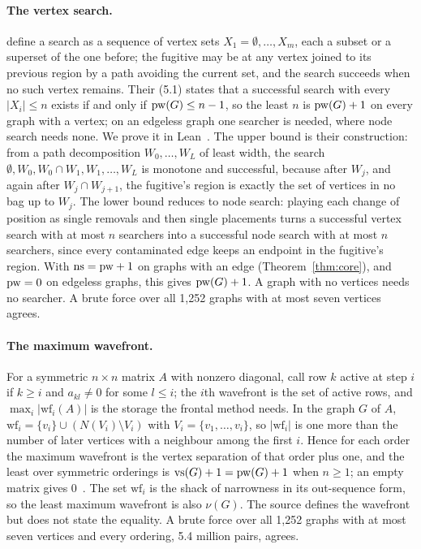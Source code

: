 \paragraph{The vertex search.} \citet[\S5]{BRST1991} define a search as a
sequence of vertex sets $X_1=\emptyset,\dots,X_m$, each a subset or a superset
of the one before; the fugitive may be at any vertex joined to its previous
region by a path avoiding the current set, and the search succeeds when no such
vertex remains. Their (5.1) states that a successful search with every
$|X_i|\le n$ exists if and only if $\mathrm{pw}(G)\le n-1$, so the least $n$ is
$\mathrm{pw}(G)+1$ on every graph with a vertex; on an edgeless graph one searcher is
needed, where node search needs none. We prove it in Lean~.
The upper bound is their construction: from a path decomposition
$W_0,\dots,W_L$ of least width, the search
$\emptyset,W_0,W_0\cap W_1,W_1,\dots,W_L$ is monotone and successful, because
after $W_j$, and again after $W_j\cap W_{j+1}$, the fugitive's region is
exactly the set of vertices in no bag up to $W_j$. The lower bound reduces to
node search: playing each change of position as single removals and then
single placements turns a successful vertex search with at most $n$ searchers
into a successful node search with at most $n$ searchers, since every
contaminated edge keeps an endpoint in the fugitive's region. With
$\mathrm{ns}=\mathrm{pw}+1$ on graphs with an edge (Theorem~\ref{thm:core}), and $\mathrm{pw}=0$ on
edgeless graphs, this gives $\mathrm{pw}(G)+1$. A graph with no vertices needs no
searcher. A brute force over all 1,252 graphs with at most seven vertices
agrees.

\paragraph{The maximum wavefront.} For a symmetric $n\times n$ matrix $A$ with
nonzero diagonal, \citet[\S2.1]{KumfertPothen1997} call row $k$ active at step
$i$ if $k\ge i$ and $a_{kl}\ne0$ for some $l\le i$; the $i$th wavefront is the
set of active rows, and $\max_i|\mathrm{wf}_i(A)|$ is the storage the frontal
method needs. In the graph $G$ of $A$, $\mathrm{wf}_i=\{v_i\}\cup(N(V_i)\setminus
V_i)$ with $V_i=\{v_1,\dots,v_i\}$, so $|\mathrm{wf}_i|$ is one more than the
number of later vertices with a neighbour among the first $i$. Hence for each
order the maximum wavefront is the vertex separation of that order plus one,
and the least over symmetric orderings is $\mathrm{vs}(G)+1=\mathrm{pw}(G)+1$ when $n\ge1$; an
empty matrix gives 0~. The set $\mathrm{wf}_i$ is the
shack of narrowness in its out-sequence form, so the least maximum wavefront is
also $\nu(G)$. The source defines the wavefront but does not state the
equality. A brute force over all 1,252 graphs with at most seven vertices and
every ordering, 5.4 million pairs, agrees.

